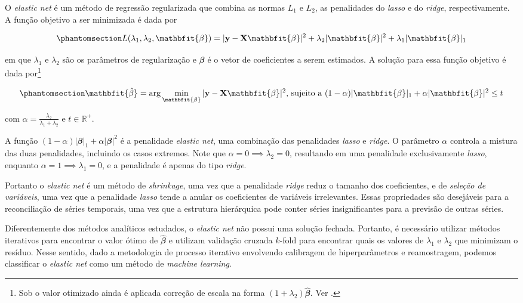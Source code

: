 \documentclass[
  12pt,
  twoside,
  openright,
  a4paper,
  chapter=TITLE,
  section=TITLE,
  brazil]{abntex2}
\begin{document}
\begin{apendicesenv}
O \emph{elastic net} \autocite{zou_regularization_2005} é um método de
regressão regularizada que combina as normas \(L_1\) e \(L_2\), as
penalidades do \emph{lasso} e do \emph{ridge}, respectivamente. A função
objetivo a ser minimizada é dada por

\begin{equation}\phantomsection\label{eq-elastic_net}{
L(\lambda_1, \lambda_2, \mathbfit{\beta}) = |\mathbf{y} - \mathbf{X}\mathbfit{\beta}|^2 + \lambda_2|\mathbfit{\beta}|^2 + \lambda_1|\mathbfit{\beta}|_1
}\end{equation}

\noindent em que \(\lambda_1\) e \(\lambda_2\) são os parâmetros de
regularização e \(\mathbfit{\beta}\) é o vetor de coeficientes a serem
estimados. A solução para essa função objetivo é dada por\footnote{Sob o
  valor otimizado ainda é aplicada correção de escala na forma
  \((1+\lambda_2)\mathbfit{\hat{\beta}}\). Ver
  \textcite{zou_regularization_2005}.}

\begin{equation}\phantomsection\label{eq-elastic_net_solution}{
\mathbfit{\hat{\beta}} = \arg \min_{\mathbfit{\beta}} |\mathbf{y}-\mathbf{X}\mathbfit{\beta}|^2 \text{, sujeito a } (1-\alpha)|\mathbfit{\beta}|_1 + \alpha|\mathbfit{\beta}|^2 \leq t
}\end{equation}

\noindent com \(\alpha = \frac{\lambda_2}{\lambda_1 + \lambda_2}\) e
\(t \in \mathbb{R}^+\).

A função \((1-\alpha)|\mathbfit{\beta}|_1 + \alpha|\mathbfit{\beta}|^2\)
é a penalidade \emph{elastic net}, uma combinação das penalidades
\emph{lasso} e \emph{ridge}. O parâmetro \(\alpha\) controla a mistura
das duas penalidades, incluindo os casos extremos. Note que
\(\alpha = 0 \implies \lambda_2 = 0\), resultando em uma penalidade
exclusivamente \emph{lasso}, enquanto
\(\alpha = 1 \implies \lambda_1 = 0\), e a penalidade é apenas do tipo
\emph{ridge}.

Portanto o \emph{elastic net} é um método de \emph{shrinkage}, uma vez
que a penalidade \emph{ridge} reduz o tamanho dos coeficientes, e de
\emph{seleção de variáveis}, uma vez que a penalidade \emph{lasso} tende
a anular os coeficientes de variáveis irrelevantes. Essas propriedades
são desejáveis para a reconciliação de séries temporais, uma vez que a
estrutura hierárquica pode conter séries insignificantes para a previsão
de outras séries.

Diferentemente dos métodos analíticos estudados, o \emph{elastic net}
não possui uma solução fechada. Portanto, é necessário utilizar métodos
iterativos para encontrar o valor ótimo de \(\mathbfit{\hat{\beta}}\) e
\textcite{zou_regularization_2005} utilizam validação cruzada \(k\)-fold
para encontrar quais os valores de \(\lambda_1\) e \(\lambda_2\) que
minimizam o resíduo. Nesse sentido, dado a metodologia de processo
iterativo envolvendo calibragem de hiperparâmetros e reamostragem,
podemos classificar o \emph{elastic net} como um método de \emph{machine
learning}.


\end{apendicesenv}
\end{document}

